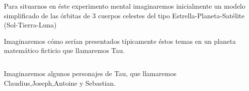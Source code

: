 \documentclass[preview]{standalone}
\begin{document}
\begin{center}
Para situarnos en éste experimento mental imaginaremos inicialmente un modelo simplificado de las órbitas de 3 cuerpos celestes del tipo Estrella-Planeta-Satélite (Sol-Tierra-Luna) 

$$ $$
Imaginaremos cómo serían presentados típicamente éstos temas en un planeta matemático ficticio que llamaremos Tau. 

$$ $$ 

Imaginaremos algunos personajes  de Tau, que llamaremos Claudius,Joseph,Antoine y Sebastian.
\end{center}
\end{document}

